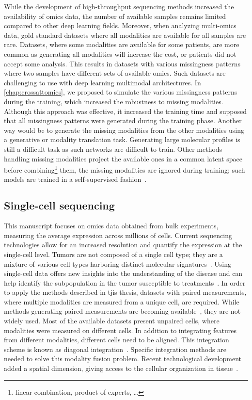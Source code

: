 \documentclass[../main.tex]{subfiles}
\begin{document}
		While the development of high-throughput sequencing methods increased the availability of omics data, the number of available samples remains limited compared to other deep learning fields.
		Moreover, when analyzing multi-omics data, gold standard datasets where all modalities are available for all samples are rare.
		Datasets, where some modalities are available for some patients, are more common as generating all modalities will increase the cost, or patients did not accept some analysis.
		This results in datasets with various missingness patterns where two samples have different sets of available omics.
		Such datasets are challenging to use with deep learning multimodal architectures.
		In \cref{chap:crossattomics}, we proposed to simulate the various missingness patterns during the training, which increased the robustness to missing modalities.
		Although this approach was effective, it increased the training time and supposed that all missingness patterns were generated during the training phase.
		Another way would be to generate the missing modalities from the other modalities using a generative or modality translation task.
		Generating large molecular profiles is still a difficult task as such networks are difficult to train.
		Other methods handling missing modalities project the available ones in a common latent space before combining\footnote{linear combination, product of experts, \dots} them, the missing modalities are ignored during training; such models are trained in a self-supervised fashion~\cite{Lee2021AVI}.

	\subsection{Single-cell sequencing}
		This manuscript focuses on omics data obtained from bulk experiments, measuring the average expression across millions of cells.
		Current sequencing technologies allow for an increased resolution and quantify the expression at the single-cell level.
		Tumors are not composed of a single cell type; they are a mixture of various cell types harboring distinct molecular signatures~\cite{TumourHetero}.
		Using single-cell data offers new insights into the understanding of the disease and can help identify the subpopulation in the tumor susceptible to treatments~\cite{DagogoJack2017}.
		In order to apply the methods described in tjis thesis, datasets with paired measurements, where multiple modalities are measured from a unique cell, are required.
		While methods generating paired measurements are becoming available~\cite{Macaulay2015,Hao2021,Vandereyken2023}, they are not widely used.
		Most of the available datasets present unpaired cells, where modalities were measured on different cells.
		In addition to integrating features from different modalities, different cells need to be aligned.
		This integration scheme is known as diagonal integration~\cite{Xu2022}.
		Specific integration methods are needed to solve this modality fusion problem.
		Recent technological development added a spatial dimension, giving access to the cellular organization in tissue~\cite{Vandereyken2023}.
\end{document}
